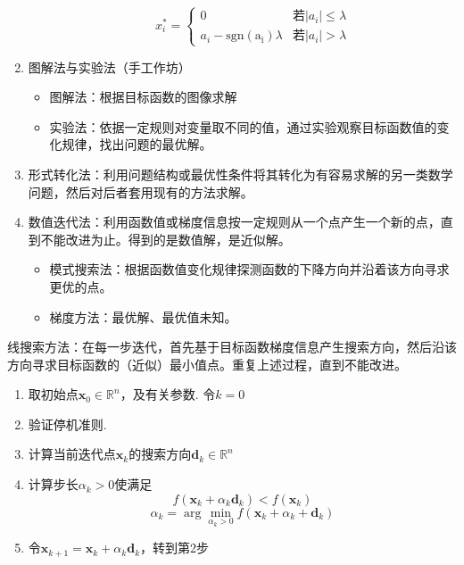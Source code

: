 \begin{enumerate}
\begin{itemize}
        \[
            x_{i}^* = \left\{
                \begin{array}{ll}
                    0  & \text{若}|a_i|\leqslant \lambda\\
                    a_i-\operatorname{sgn(a_i)}\lambda & \text{若}|a_i|>\lambda
                \end{array}
            \right.
        \]
    \end{itemize}
    \item 图解法与实验法（手工作坊）
    \begin{itemize}
        \item 图解法：根据目标函数的图像求解 
        \item 实验法：依据一定规则对变量取不同的值，通过实验观察目标函数值的变化规律，找出问题的最优解。
    \end{itemize}
    \item 形式转化法：利用问题结构或最优性条件将其转化为有容易求解的另一类数学问题，然后对后者套用现有的方法求解。
    \item 数值迭代法：利用函数值或梯度信息按一定规则从一个点产生一个新的点，直到不能改进为止。得到的是数值解，是近似解。
    \begin{itemize}
        \item 模式搜索法：根据函数值变化规律探测函数的下降方向并沿着该方向寻求更优的点。
        \item 梯度方法：最优解、最优值未知。
    \end{itemize}
\end{enumerate}
\begin{note}
    线搜索方法：在每一步迭代，首先基于目标函数梯度信息产生搜索方向，然后沿该方向寻求目标函数的（近似）最小值点。重复上述过程，直到不能改进。
    \begin{enumerate}
        \item 取初始点$\boldsymbol{x}_0\in \mathbb{R}^n$，及有关参数. 令$k = 0$
        \item 验证停机准则.
        \item 计算当前迭代点$\boldsymbol{x}_k$的搜索方向$\boldsymbol{d}_k\in \mathbb{R}^n$
        \item 计算步长$\alpha_k>0$使满足
        \[
            f(\boldsymbol{x}_k+\alpha_k\boldsymbol{d}_k)<f(\boldsymbol{x}_k)
        \]    
        \[
            \alpha_k = \arg\min\limits_{\alpha_k>0}f(\boldsymbol{x}_k+\alpha_k+\boldsymbol{d}_k)
        \] 
        \item 令$\boldsymbol{x}_{k+1}=\boldsymbol{x}_k+\alpha_k\boldsymbol{d}_k$，转到第2步
    \end{enumerate}
\end{note}
